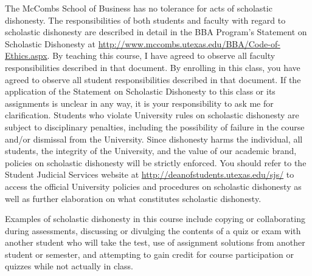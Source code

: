 \documentclass[12pt]{article}
\begin{document}
The McCombs School of Business has no tolerance for acts of scholastic dishonesty. The responsibilities of both students and faculty with regard to scholastic dishonesty are described in detail in the BBA Program's Statement on Scholastic Dishonesty at \url{http://www.mccombs.utexas.edu/BBA/Code-of-Ethics.aspx}.  By teaching this course, I have agreed to observe all faculty responsibilities described in that document. By enrolling in this class, you have agreed to observe all student responsibilities described in that document. If the application of the Statement on Scholastic Dishonesty to this class or its assignments is unclear in any way, it is your responsibility to ask me for clarification. Students who violate University rules on scholastic dishonesty are subject to disciplinary penalties, including the possibility of failure in the course and/or dismissal from the University. Since dishonesty harms the individual, all students, the integrity of the University, and the value of our academic brand, policies on scholastic dishonesty will be strictly enforced. You should refer to the Student Judicial Services website at \url{http://deanofstudents.utexas.edu/sjs/} to access the official University policies and procedures on scholastic dishonesty as well as further elaboration on what constitutes scholastic dishonesty.

Examples of scholastic dishonesty in this course include copying or collaborating during assessments, discussing or divulging the contents of a quiz or exam with another student who will take the test, use of assignment solutions from another student or semester, and attempting to gain credit for course participation or quizzes while not actually in class.
\end{document}
